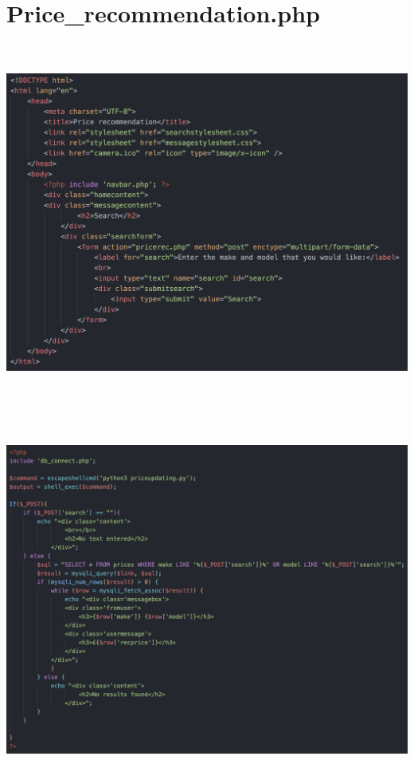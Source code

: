 \section*{Price\_recommendation.php}

\includegraphics[width=6.26806in,height=4.64931in]{ch6_appendix/media/image15.png}

\includegraphics[width=6.26806in,height=4.81319in]{ch6_appendix/media/image16.png}

